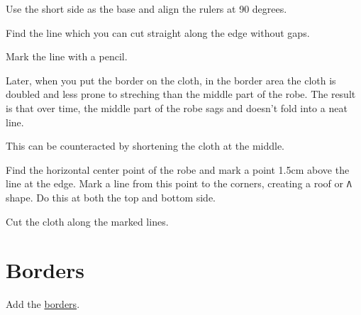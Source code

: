 Use the short side as the base and align the rulers at 90 degrees.

Find the line which you can cut straight along the edge without gaps.

\begin{multicols}{2}
\setlength{\nextPhotoWidth}{\linewidth}


\columnbreak
\setlength{\nextPhotoWidth}{\linewidth}


\end{multicols}

Mark the line with a pencil.

Later, when you put the border on the cloth, in the border area the
cloth is doubled and less prone to streching than the middle part of the
robe. The result is that over time, the middle part of the robe sags and
doesn't fold into a neat line.

This can be counteracted by shortening the cloth at the middle.

Find the horizontal center point of the robe and mark a point 1.5cm
above the line at the edge. Mark a line from this point to the corners,
creating a roof or \texttt{Λ} shape. Do this at both the top and bottom
side.


Cut the cloth along the marked lines.


\section{Borders}

Add the \href{/en/borders}{borders}.

